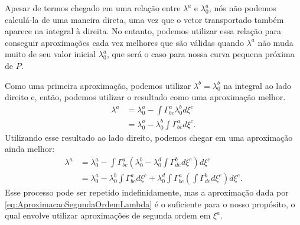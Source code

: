 Apesar de termos chegado em uma relação entre $\lambda^a$ e $\lambda^a_0$, nós não podemos calculá-la de uma maneira direta, uma vez que o vetor transportado também aparece na integral à direita. No entanto, podemos utilizar essa relação para conseguir aproximações cada vez melhores que são válidas quando $\lambda^a$ não muda muito de seu valor inicial $\lambda^a_0$, que será o caso para nossa curva pequena próxima de $P$.

Como uma primeira aproximação, podemos utilizar $\lambda^b = \lambda^b_0$ na integral ao lado direito e, então, podemos utilizar o resultado como uma aproximação melhor.
\begin{align*}
	\lambda^a &= \lambda^a_0 - \int\Gamma^a_{bc}\lambda^b_0 d\xi^c \\
	&= \lambda^a_0 - \lambda^b_0\int\Gamma^a_{bc}d\xi^c .
\end{align*}
Utilizando esse resultado ao lado direito, podemos chegar em uma aproximação ainda melhor:
\begin{equation}\label{eq:AproximacaoSegundaOrdemLambda}
\begin{aligned} \lambda^{a} &=\lambda_{0}^{a}-\int \Gamma_{b c}^{a}\left(\lambda_{0}^{b}-\lambda_{0}^{d} \int \Gamma_{d e}^{b} d \xi^{e}\right) d \xi^{c} \\ &=\lambda_{0}^{a}-\lambda_{0}^{b} \int \Gamma_{b c}^{a} d \xi^{c}+\lambda_{0}^{d} \int \Gamma_{b c}^{a}\left(\int \Gamma_{d e}^{b} d \xi^{e}\right) d \xi^{c}. \end{aligned}
\end{equation}
Esse processo pode ser repetido indefinidamente, mas a aproximação dada por \eqref{eq:AproximacaoSegundaOrdemLambda} é o suficiente para o nosso propósito, o qual envolve utilizar aproximações de segunda ordem em $\xi^a$.

